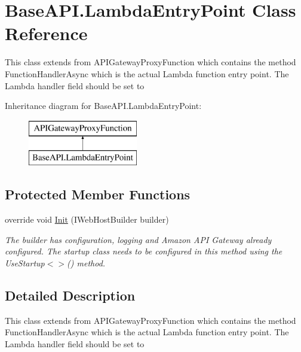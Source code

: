\hypertarget{class_base_a_p_i_1_1_lambda_entry_point}{}\section{Base\+A\+P\+I.\+Lambda\+Entry\+Point Class Reference}
\label{class_base_a_p_i_1_1_lambda_entry_point}


This class extends from A\+P\+I\+Gateway\+Proxy\+Function which contains the method Function\+Handler\+Async which is the actual Lambda function entry point. The Lambda handler field should be set to  


Inheritance diagram for Base\+A\+P\+I.\+Lambda\+Entry\+Point\+:\begin{figure}[H]
\begin{center}
\leavevmode
\includegraphics[height=2.000000cm]{class_base_a_p_i_1_1_lambda_entry_point}
\end{center}
\end{figure}
\subsection*{Protected Member Functions}
\begin{DoxyCompactItemize}
\item 
override void \mbox{\hyperlink{class_base_a_p_i_1_1_lambda_entry_point_ab44b2c69e3b814fb3cf39f0e0b331514}{Init}} (I\+Web\+Host\+Builder builder)
\begin{DoxyCompactList}\small\item\em The builder has configuration, logging and Amazon A\+PI Gateway already configured. The startup class needs to be configured in this method using the Use\+Startup$<$$>$() method. \end{DoxyCompactList}\end{DoxyCompactItemize}


\subsection{Detailed Description}
This class extends from A\+P\+I\+Gateway\+Proxy\+Function which contains the method Function\+Handler\+Async which is the actual Lambda function entry point. The Lambda handler field should be set to 

